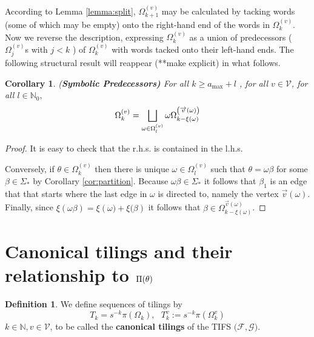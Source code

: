 \documentclass{amsproc}
\theoremstyle{plain}
\newtheorem{corollary}{Corollary}
\theoremstyle{definition}
\newtheorem{definition}{Definition}
\numberwithin{equation}{section}
\begin{document}
According to Lemma \ref{lemma:split}, $\Omega_{k+1}^{(v)}$ may be calculated
by tacking words (some of which may be empty) onto the right-hand end of the
words in $\Omega_{k}^{(v)}$. Now we reverse the description, expressing $%
\Omega_{k}^{(v)}$ as a union of predecessors ($\Omega_{j}^{(v)}$s with $j<k$%
) of $\Omega_{k}^{(v)}$ with words tacked onto their left-hand ends. The
following structural result will reappear (**make explicit) in what follows.

\begin{corollary}
\label{lem:struct}(\textbf{Symbolic Predecessors)} For all $k\geq a_{\max}+l$%
, for all $v\in\mathcal{V}$, for all $l\in\mathbb{N}_{0},$%
\begin{equation*}
\Omega_{k}^{\left( v\right) }=\bigsqcup\limits_{\omega\in\Omega_{l}^{\left(
v\right) }}\omega\Omega_{k-\xi\left( \omega\right) }^{\left( \overrightarrow{%
v}\left( \omega\right) \right) }
\end{equation*}
\end{corollary}

\begin{proof}
It is easy to check that the r.h.s. is contained in the l.h.s.

Conversely, if $\theta\in\Omega_{k}^{\left( v\right) }$ then there is unique 
$\omega\in\Omega_{l}^{\left( v\right) }$ such that $\theta=\omega\beta$ for
some $\beta\in\Sigma_{\ast}$ by Corollary \ref{cor:partition}. Because $%
\omega\beta\in\Sigma_{\ast}$ it follows that $\beta_{1}$ is an edge that
that starts where the last edge in $\omega$ is directed to, namely the
vertex $\overrightarrow{v}\left( \omega\right) $. Finally, since $\xi\left(
\omega\beta\right) =\xi\left( \omega)+\xi(\beta\right) $ it follows that $%
\beta\in\Omega_{k-\xi\left( \omega\right) }^{\overrightarrow{v}\left(
\omega\right) }$.
\end{proof}

\section{\label{canonical}Canonical tilings and their relationship to $\Pi(%
\protect\theta)$}

\begin{definition}
We define sequences of tilings by 
\begin{equation*}
T_{k}=s^{-k}\pi(\Omega_{k}),\text{ }T_{k}^{v}:=s^{-k}\pi(\Omega_{k}^{v})
\end{equation*}
$k\in\mathbb{N},v\in\mathcal{V}$, to be called the \textbf{canonical tilings 
}of the TIFS $(\mathcal{F},\mathcal{G)}.$
\end{definition}
\end{document}
